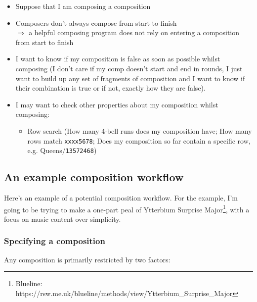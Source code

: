\documentclass[12pt]{article}
\newcommand{\row}[1]{\texttt{#1}}
\begin{document}
\begin{itemize}
    \item Suppose that I am composing a composition
    \item Composers don't always compose from start to finish \\
        $\Rightarrow$ a helpful composing program does not rely on entering a composition from
        start to finish
    \item I want to know if my composition is false as soon as possible whilst composing (I don't
        care if my comp doesn't start and end in rounds, I just want to build up any set of fragments
        of composition and I want to know if their combination is true or if not, exactly how they
        are false).
    \item I may want to check other properties about my composition whilst composing:
        \begin{itemize}
            \item Row search (How many 4-bell runs does my composition have;
                How many rows match \row{xxxx5678};
                Does my composition so far contain a specific row, e.g. Queens/\row{13572468})
        \end{itemize}
\end{itemize}

\subsection{An example composition workflow}

Here's an example of a potential composition workflow.  For the example, I'm going to be trying to
make a one-part peal of Ytterbium Surprise
Major\footnote{Blueline: https://rsw.me.uk/blueline/methods/view/Ytterbium\_Surprise\_Major}, with
a focus on music content over simplicity.

\subsubsection{Specifying a composition}

Any composition is primarily restricted by two factors:
\end{document}
